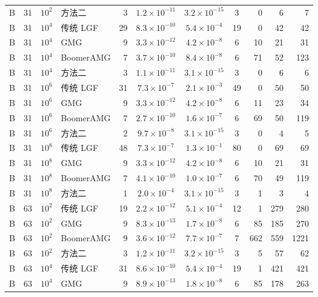\begin{longtable}{lrrlrcccrrr}
B & 31 & $10^{2}$ & 方法二 & 3 & $1.2{\times}10^{-11}$ & $3.2{\times}10^{-15}$ & 3 & 0 & 6 & 7 \\
B & 31 & $10^{4}$ & 传统 LGF & 29 & $8.3{\times}10^{-10}$ & $5.4{\times}10^{-4}$ & 19 & 0 & 42 & 42 \\
B & 31 & $10^{4}$ & GMG & 9 & $3.3{\times}10^{-12}$ & $4.2{\times}10^{-8}$ & 6 & 10 & 21 & 31 \\
B & 31 & $10^{4}$ & BoomerAMG & 7 & $3.7{\times}10^{-10}$ & $8.4{\times}10^{-8}$ & 6 & 71 & 52 & 123 \\
B & 31 & $10^{4}$ & 方法二 & 3 & $1.1{\times}10^{-11}$ & $3.1{\times}10^{-15}$ & 3 & 0 & 6 & 6 \\
B & 31 & $10^{6}$ & 传统 LGF & 31 & $7.3{\times}10^{-7}$ & $2.1{\times}10^{-3}$ & 49 & 0 & 50 & 50 \\
B & 31 & $10^{6}$ & GMG & 9 & $3.3{\times}10^{-12}$ & $4.2{\times}10^{-8}$ & 6 & 11 & 23 & 34 \\
B & 31 & $10^{6}$ & BoomerAMG & 7 & $2.7{\times}10^{-10}$ & $1.6{\times}10^{-7}$ & 6 & 69 & 50 & 119 \\
B & 31 & $10^{6}$ & 方法二 & 2 & $9.7{\times}10^{-8}$ & $3.1{\times}10^{-15}$ & 3 & 0 & 4 & 5 \\
B & 31 & $10^{8}$ & 传统 LGF & 48 & $7.3{\times}10^{-7}$ & $1.3{\times}10^{-1}$ & 80 & 0 & 69 & 69 \\
B & 31 & $10^{8}$ & GMG & 9 & $3.3{\times}10^{-12}$ & $4.2{\times}10^{-8}$ & 6 & 10 & 21 & 31 \\
B & 31 & $10^{8}$ & BoomerAMG & 7 & $4.1{\times}10^{-10}$ & $1.0{\times}10^{-7}$ & 6 & 70 & 49 & 119 \\
B & 31 & $10^{8}$ & 方法二 & 1 & $2.0{\times}10^{-4}$ & $3.1{\times}10^{-15}$ & 3 & 1 & 3 & 4 \\
B & 63 & $10^{2}$ & 传统 LGF & 19 & $2.2{\times}10^{-12}$ & $5.1{\times}10^{-4}$ & 12 & 1 & 279 & 280 \\
B & 63 & $10^{2}$ & GMG & 9 & $8.3{\times}10^{-13}$ & $1.7{\times}10^{-8}$ & 6 & 85 & 185 & 270 \\
B & 63 & $10^{2}$ & BoomerAMG & 9 & $3.6{\times}10^{-12}$ & $7.7{\times}10^{-7}$ & 7 & 662 & 559 & 1221 \\
B & 63 & $10^{2}$ & 方法二 & 3 & $1.2{\times}10^{-11}$ & $3.2{\times}10^{-15}$ & 3 & 5 & 57 & 62 \\
B & 63 & $10^{4}$ & 传统 LGF & 31 & $8.6{\times}10^{-10}$ & $5.4{\times}10^{-4}$ & 19 & 1 & 421 & 421 \\
B & 63 & $10^{4}$ & GMG & 9 & $8.9{\times}10^{-13}$ & $1.8{\times}10^{-8}$ & 6 & 85 & 178 & 263 \\

\end{longtable}
